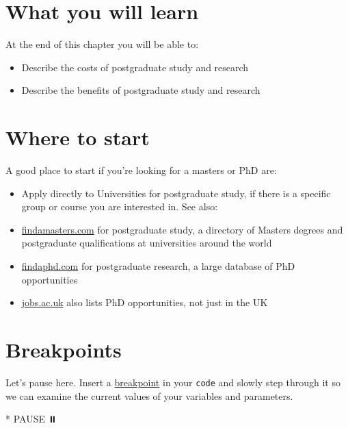 \documentclass[
]{book}
\newenvironment{Shaded}{\begin{snugshade}}{\end{snugshade}}
\newcommand{\NormalTok}[1]{#1}
\newcommand{\SpecialStringTok}[1]{\textcolor[rgb]{0.31,0.60,0.02}{#1}}
\providecommand{\tightlist}{%
  \setlength{\itemsep}{0pt}\setlength{\parskip}{0pt}}
\begin{document}
\hypertarget{ilo12}{%
\section{What you will learn}\label{ilo12}}

At the end of this chapter you will be able to:

\begin{itemize}
\tightlist
\item
  Describe the costs of postgraduate study and research
\item
  Describe the benefits of postgraduate study and research
\end{itemize}

\hypertarget{finda}{%
\section{Where to start}\label{finda}}

A good place to start if you're looking for a masters or PhD are:

\begin{itemize}
\tightlist
\item
  Apply directly to Universities for postgraduate study, if there is a specific group or course you are interested in. See also:
\item
  \href{https://www.findamasters.com/}{findamasters.com} for postgraduate study, a directory of Masters degrees and postgraduate qualifications at universities around the world
\item
  \href{https://www.findaphd.com/}{findaphd.com} for postgraduate research, a large database of PhD opportunities
\item
  \href{https://www.jobs.ac.uk/}{jobs.ac.uk} also lists PhD opportunities, not just in the UK
\end{itemize}

\hypertarget{rbreakpoints}{%
\section{Breakpoints}\label{rbreakpoints}}

Let's pause here. Insert a \href{https://en.wikipedia.org/wiki/Breakpoint}{breakpoint} in your \texttt{code} and slowly step through it so we can examine the current values of your variables and parameters.

\begin{Shaded}
\begin{Highlighting}[]
\SpecialStringTok{* }\NormalTok{PAUSE ⏸️}
\end{Highlighting}
\end{Shaded}
\end{document}
